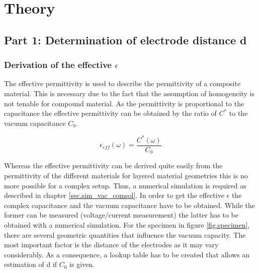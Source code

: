 \chapter{Theory}
\section{Part 1: Determination of electrode distance d}

\subsection{Derivation of the effective $\epsilon$}
\label{subsec.Derivationeffective}
The effective permittivity is used to describe the permittivity of a composite material. This is necessary due to the fact that the assumption of homogeneity is not tenable for compound material. As the permittivity is proportional to the capacitance the effective permittivity can be obtained by the ratio of $C^*$ to the vacuum capacitance $C_0$.

\begin{equation}
\epsilon_{eff}(\omega)= \frac{C^*(\omega)}{C_0} 
\end{equation}

Whereas the effective permittivity can be derived quite easily from the permittivity of the different materials for layered material geometries this is no more  possible for a complex setup. Thus, a numerical simulation is required as described in chapter \ref{sec.sim_vac_comsol}. In order to get the effective $\epsilon$ the complex capacitance and the vacuum capacitance have to be obtained. While the former can be measured (voltage/current measurement) the latter has to be obtained with a numerical simulation. 
For the specimen in figure \ref{fig.specimen}, there are several geometric quantities that influence the vacuum capacity. The most important factor is the distance of the electrodes as it may vary considerably. As a consequence, a lookup table has to be created that allows an estimation of d if $C_0$ is given.

 


